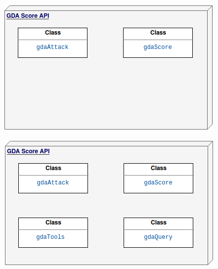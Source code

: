 \documentclass{fancyslides}
\begin{document}
\begin{frame}
\begin{center}
\includegraphics[width=1\linewidth]{api02.png}
\end{center}
\end{frame}


\begin{frame}
\begin{center}
\includegraphics[width=1\linewidth]{api.png}
\end{center}
\end{frame}


\begin{frame}
\end{frame}
\end{document}
